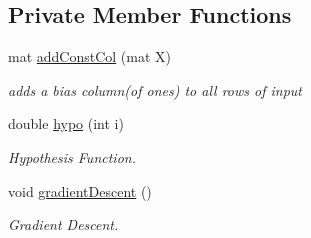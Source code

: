 \subsection*{Private Member Functions}
\begin{DoxyCompactItemize}
\item 
\mbox{\label{classLogisticClassifier_a2010acc9c0843ee6f5c306622ec30b12}} 
mat \hyperlink{classLogisticClassifier_a2010acc9c0843ee6f5c306622ec30b12}{add\+Const\+Col} (mat X)
\begin{DoxyCompactList}\small\item\em adds a bias column(of ones) to all rows of input \end{DoxyCompactList}\item 
\mbox{\label{classLogisticClassifier_aa76704935e6335c625ba3792a0452666}} 
double \hyperlink{classLogisticClassifier_aa76704935e6335c625ba3792a0452666}{hypo} (int i)
\begin{DoxyCompactList}\small\item\em Hypothesis Function. \end{DoxyCompactList}\item 
\mbox{\label{classLogisticClassifier_a75dda261a64ee2dff0e37b01d7cc0de7}} 
void \hyperlink{classLogisticClassifier_a75dda261a64ee2dff0e37b01d7cc0de7}{gradient\+Descent} ()
\begin{DoxyCompactList}\small\item\em Gradient Descent. \end{DoxyCompactList}\end{DoxyCompactItemize}
